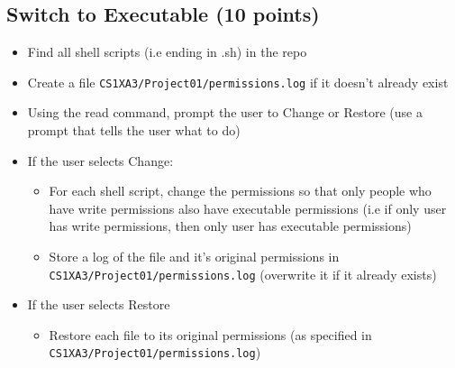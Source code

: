 \documentclass{article}
\begin{document}
\subsection{Switch to Executable (10 points)}
\label{sec:org6ac54dd}
\begin{itemize}
\item Find all shell scripts (i.e ending in {\color{purple}.sh}) in the repo
\item Create a file \texttt{CS1XA3/Project01/permissions.log} if it doesn't already exist
\item Using the read command, prompt the user to {\color{purple}Change} or
{\color{purple}Restore} (use a prompt that tells the user what to do)
\item If the user selects {\color{purple}Change}:
\begin{itemize}
\item For each shell script, change the permissions so that only people who
have write permissions also have executable permissions (i.e if only
user has write permissions, then only user has executable permissions)
\item Store a log of the file and it's original permissions in
\texttt{CS1XA3/Project01/permissions.log} (overwrite it if it already exists)
\end{itemize}
\item If the user selects {\color{purple}Restore}
\begin{itemize}
\item Restore each file to its original permissions (as specified in
\texttt{CS1XA3/Project01/permissions.log})
\end{itemize}
\end{itemize}
\end{document}
